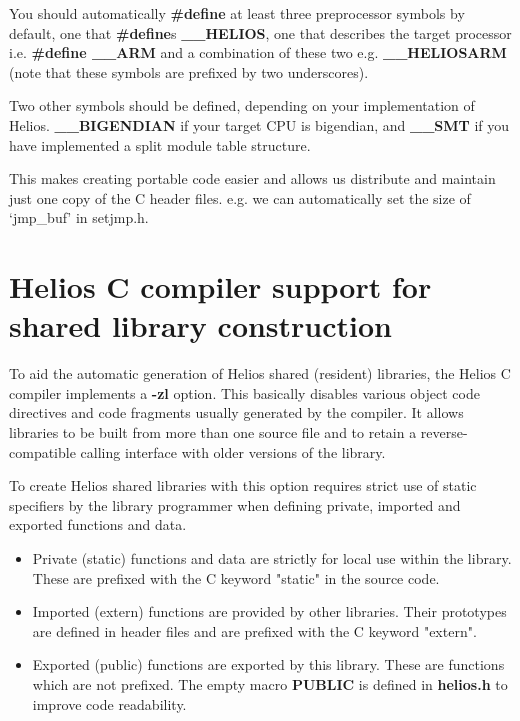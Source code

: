 You should automatically {\bf \#define} at least three preprocessor
symbols by default, one that {\bf \#define}s {\bf \_\_HELIOS}, one that
describes the target processor i.e. {\bf \#define \_\_ARM} and
a combination of these two e.g. {\bf \_\_HELIOSARM}
(note that these symbols are prefixed by two underscores).

Two other symbols should be defined, depending on your implementation of
Helios. {\bf \_\_BIGENDIAN} if your target CPU is bigendian, and {\bf \_\_SMT}
if you have implemented a split module table structure.

This makes creating portable code easier and allows us
distribute and maintain just one copy of the C header files. e.g. we can
automatically set the size of `jmp\_buf' in setjmp.h.

\section{Helios C compiler support for shared library construction}

To aid the automatic generation of Helios shared (resident) libraries,
the Helios C compiler implements a {\bf -zl} option. This basically
disables various object code directives and code fragments usually
generated by the compiler. It allows libraries to be built from more
than one source file and to retain a reverse-compatible calling
interface with older versions of the library.

To create Helios shared libraries with this option requires strict use
of static specifiers by the library programmer when
defining private, imported and exported functions and data.

\begin{itemize}
\item Private (static) functions and data are strictly for local use
within the library. These are prefixed with the C keyword "static" in the
source code.

\item Imported (extern) functions are provided by other libraries. Their
prototypes are defined in header files and are prefixed with the C keyword
"extern".

\item Exported (public) functions are exported by this library. These
are functions which are not prefixed. The empty macro {\bf PUBLIC} is
defined in {\bf helios.h} to improve code readability.

\end{itemize}

